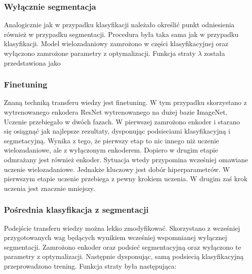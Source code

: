 \subsubsection{Wyłącznie segmentacja}
Analogicznie jak w przypadku klasyfikacji należało określić punkt odniesienia również w przypadku segmentacji. Procedura była taka sama jak w przypadku klasyfikacji. Model wielozadaniowy zamrożono w części klasyfikacyjnej oraz wyłączono zamrożone parametry z optymalizacji. Funkcja straty $\lambda$ została przedstawiona jako
\subsubsection{Finetuning}
Znaną techniką transferu wiedzy jest finetuning. W tym przypadku skorzystano z wytrenowanego enkodera ResNet wytrenowanego na dużej bazie ImageNet. Uczenie przebiegało w dwóch fazach. W pierwszej zamrożono enkoder i starano się osiągnąć jak najlepsze rezultaty, dysponując podsieciami klasyfikacyjną i segmetacyjną. Wynika z tego, że pierwszy etap to nic innego niż uczenie wielozadaniowe, ale z wyłączonym enkoderem. Dopiero w drugim etapie odmrażany jest również enkoder. Sytuacja wtedy przypomina wcześniej omawiane uczenie wielozadaniowe. Jednakże kluczowy jest dobór hiperparametrów. W pierwszym etapie uczenie przebiega z pewny krokiem uczenia. W drugim zaś krok uczenia jest znacznie mniejszy.
\subsubsection{Pośrednia klasyfikacja z segmentacji}
Podejście transferu wiedzy można lekko zmodyfikować. Skorzystano z wcześniej przygotowanych wag będących wynikiem wcześniej wspomnianej wyłącznej segmentacji. Zamrożono enkoder oraz podsieć segmentacyjną oraz wyłączono te parametry z optymalizacji. Następnie dysponując, samą podsiecią klasyfikacyjną przeprowadzono trening. Funkcja straty była następująca:

